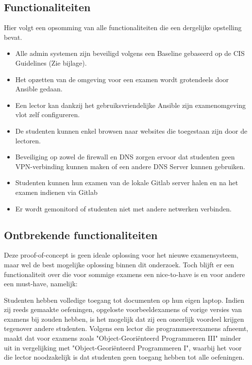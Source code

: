 \subsection{Functionaliteiten}

Hier volgt een opsomming van alle functionaliteiten die een dergelijke opstelling bevat.

\begin{itemize}
	\item Alle admin systemen zijn beveiligd volgens een Baseline gebaseerd op de CIS Guidelines (Zie bijlage).
	\item Het opzetten van de omgeving voor een examen wordt grotendeels door Ansible gedaan.
	\item Een lector kan dankzij het gebruiksvriendelijke Ansible zijn examenomgeving vlot zelf configureren.
	\item De studenten kunnen enkel browsen naar websites die toegestaan zijn door de lectoren.
	\item Beveiliging op zowel de firewall en DNS zorgen ervoor dat studenten geen VPN-verbinding kunnen maken of een andere DNS Server kunnen gebruiken.
	\item Studenten kunnen hun examen van de lokale Gitlab server halen en na het examen indienen via Gitlab
	\item Er wordt gemonitord of studenten niet met andere netwerken verbinden.
\end{itemize}

\subsection{Ontbrekende functionaliteiten}

Deze proof-of-concept is geen ideale oplossing voor het nieuwe examensysteem, maar wel de best mogelijke oplossing binnen dit onderzoek.
Toch blijft er een functionaliteit over die voor sommige examens een nice-to-have is en voor andere een must-have, namelijk: 

Studenten hebben volledige toegang tot documenten op hun eigen laptop. Indien zij reeds gemaakte oefeningen, opgeloste voorbeeldexamens of vorige versies van examens bij zouden hebben, is het mogelijk dat zij een oneerlijk voordeel krijgen tegenover andere studenten. Volgens een lector die programmeerexamens afneemt, maakt dat voor examens zoals "Object-Geori\"{e}nteerd Programmeren III" minder uit in vergelijking met "Object-Geori\"{e}nteerd Programmeren I", waarbij het voor die lector noodzakelijk is dat studenten geen toegang hebben tot alle oefeningen.

